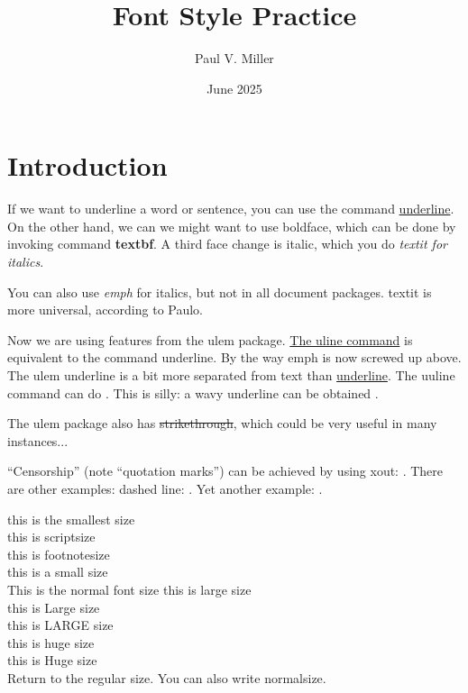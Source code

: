 \documentclass{article}
\title{Font Style Practice}
\author{Paul V. Miller}
\date{June 2025}
\begin{document}
\maketitle

\section{Introduction}

If we want to underline a word or sentence, you can use the command \underline{underline}. On the other hand, we can we might want to use boldface, which can be done by invoking command \textbf{textbf}. A third face change is italic, which you do \textit{textit for italics}.

You can also use \emph{emph} for italics, but not in all document packages. textit is more universal, according to Paulo.

Now we are using features from the ulem package.
\uline{The uline command} is equivalent to the command {underline}. By the way emph is now screwed up above. The ulem underline is a bit more separated from text than \underline{underline}. The uuline command can do . This is silly: a wavy underline can be obtained .

The ulem package also has \sout{strikethrough}, which could be very useful in many instances...

``Censorship'' (note ``quotation marks'') can be achieved by using xout: . There are other examples: dashed line: . Yet another example: .

\clearpage

\noindent
{\tiny this is the smallest size} \\
{\scriptsize this is scriptsize} \\
{\footnotesize this is footnotesize} \\
{\small this is a small size} \\
{\normalsize This is the normal font size}
{\large this is large size} \\
{\Large this is Large size} \\
{\LARGE this is LARGE size} \\
{\huge this is huge size} \\
{\Huge this is Huge size} \\

Return to the regular size. You can also write
\normalsize normalsize.
\end{document}
